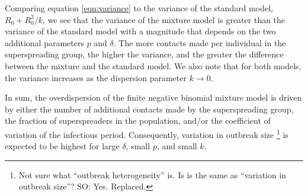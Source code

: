 \documentclass{imammb}
\numberwithin{equation}{section}
\newcommand{\comment}[1]{}
\begin{document}
Comparing equation \eqref{eqn:variance} to the variance of the standard model, $R_0+R_0^2/k$, we see that the variance of the mixture model is greater than the variance of the standard model with a magnitude that depends on the two additional parameters $p$ and $\delta$. The more  contacts made per individual in the superspreading group, the higher the variance, and the greater the difference between the mixture and the standard model. We also note that for both models, the variance increases as the dispersion parameter $k\rightarrow 0$.

In sum,  the overdispersion of the finite negative binomial mixture model is driven by either the number of additional contacts made by the superspreading group, the fraction of superspreaders in the population, and/or the coefficient of variation of the infectious period. Consequently, variation in outbreak size \footnote{Not sure what ``outbreak heterogeneity'' is. Is is the same as ``variation in outbreak size''? SO: Yes. Replaced.} is expected to be highest for large $\delta$, small $p$, and small $k$.  %


\comment{
\begin{align*}
P(5 \text{ secondary infections }) &= P( \text{ 5 secondary infections from infectious individual in superspreading group}) \\&\text{ or } P( \text{ 5 secondary infections from infectious individual in regular group })\\
&=P(\text{choosing regular infectious individ})P(5 \text{ infections conditional on regular infectious individ})\\ &\text{or } P(\text{superspreading})P(5 \text{infections conditional on being from superspreading group}), 
\end{align*}
or expressed mathematically as,
\begin{align*}
    P(I=5) &=(1-p) P(I=5|\text{regular}) +p P(I=5|\text{superspreading}) \\
     &=p P(T=5|\mathcal{V}=\beta^R) +(1-p) P(T=5|\mathcal{V}=\beta^A)\\
     &=p \frac{(\beta^R)^5}{5!} e^{-\beta^R} +(1-p)\frac{(\beta^A)^5}{5!} e^{-\beta^A}.
\end{align*}
}
\end{document}
